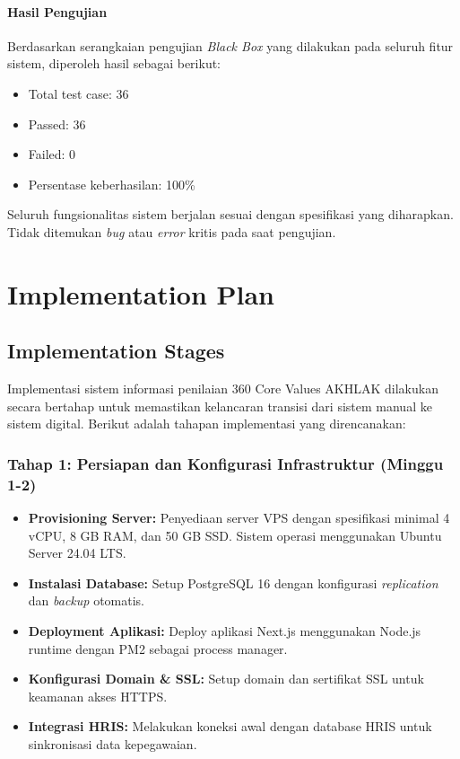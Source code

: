 \documentclass[12pt,a4paper,oneside]{report}
\begin{document}
\subsubsection{Hasil Pengujian}

Berdasarkan serangkaian pengujian \textit{Black Box} yang dilakukan pada seluruh fitur sistem, diperoleh hasil sebagai berikut:

\begin{itemize}
  \item Total test case: 36
  \item Passed: 36
  \item Failed: 0
  \item Persentase keberhasilan: 100\%
\end{itemize}

Seluruh fungsionalitas sistem berjalan sesuai dengan spesifikasi yang diharapkan. Tidak ditemukan \textit{bug} atau \textit{error} kritis pada saat pengujian.

\chapter{Implementation Plan}

\section{Implementation Stages}

Implementasi sistem informasi penilaian 360\textdegree{} Core Values AKHLAK dilakukan secara bertahap untuk memastikan kelancaran transisi dari sistem manual ke sistem digital. Berikut adalah tahapan implementasi yang direncanakan:

\subsection{Tahap 1: Persiapan dan Konfigurasi Infrastruktur (Minggu 1-2)}

\begin{itemize}
  \item \textbf{Provisioning Server:} Penyediaan server VPS dengan spesifikasi minimal 4 vCPU, 8 GB RAM, dan 50 GB SSD. Sistem operasi menggunakan Ubuntu Server 24.04 LTS.
  \item \textbf{Instalasi Database:} Setup PostgreSQL 16 dengan konfigurasi \textit{replication} dan \textit{backup} otomatis.
  \item \textbf{Deployment Aplikasi:} Deploy aplikasi Next.js menggunakan Node.js runtime dengan PM2 sebagai process manager.
  \item \textbf{Konfigurasi Domain \& SSL:} Setup domain dan sertifikat SSL untuk keamanan akses HTTPS.
  \item \textbf{Integrasi HRIS:} Melakukan koneksi awal dengan database HRIS untuk sinkronisasi data kepegawaian.
\end{itemize}
\end{document}
